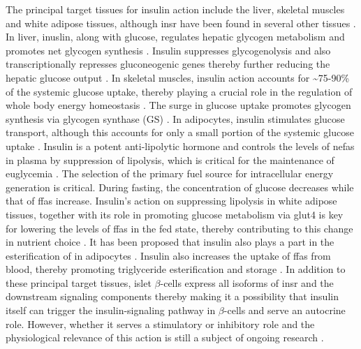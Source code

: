 
The principal target tissues for insulin action include the liver, skeletal muscles and white adipose tissues, although \gls{insr} have been found in several other tissues \textbf{\cite{spencer_identification_2018}}. In liver, inuslin, along with glucose, regulates hepatic glycogen metabolism and promotes net glycogen synthesis \textbf{\cite{petersen_mechanisms_2018,rossetti_relative_1990,roden_roles_1996}}. Insulin suppresses glycogenolysis and also transcriptionally represses gluconeogenic genes thereby further reducing the hepatic glucose output \textbf{\cite{petersen_mechanisms_2018,claus_regulation_1976,cherrington_direct_1998,edgerton_insulins_2006}}. In skeletal muscles, insulin action accounts for \textasciitilde75-90\% of the systemic glucose uptake, thereby playing a crucial role in the regulation of whole body energy homeostasis \textbf{\cite{leto_regulation_2012,petersen_mechanisms_2018}}. The surge in glucose uptake promotes glycogen synthesis via glycogen synthase (GS) \textbf{\cite{sylow_many_2021}}. In adipocytes, insulin stimulates glucose transport, although this accounts for only a small portion of the systemic glucose uptake \textbf{\cite{leto_regulation_2012}}. Insulin is a potent anti-lipolytic hormone and controls the levels of \glspl{nefa} in plasma by suppression of lipolysis, which is critical for the maintenance of euglycemia \textbf{\cite{dimitriadis_glucose_2006}}. The selection of the primary fuel source for intracellular energy generation is critical. During fasting, the concentration of glucose decreases while that of \glspl{ffa} increase. Insulin's action on suppressing lipolysis in white adipose tissues, together with its role in promoting glucose metabolism via \gls{glut}4 is key for lowering the levels of \glspl{ffa} in the fed state, thereby contributing to this change in nutrient choice \textbf{\cite{hummel_free_2021}}. It has been proposed that insulin also plays a part in the esterification of  in adipocytes \textbf{\cite{lewis_disordered_2002}}. Insulin also increases the uptake of \glspl{ffa} from blood, thereby promoting triglyceride esterification and storage \textbf{\cite{czech_insulin_2013}}. %
In addition to these principal target tissues, islet $\beta$-cells express all isoforms of \gls{insr} and the downstream signaling components thereby making it a possibility that insulin itself can trigger the insulin-signaling pathway in $\beta$-cells and serve an autocrine role. However, whether it serves a stimulatory or inhibitory role and the physiological relevance of this action is still a subject of ongoing research \textbf{\cite{rhodes_direct_2013,rachdaoui_insulin_2020}}.\\


